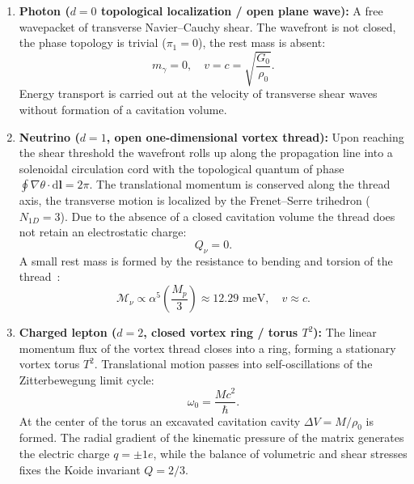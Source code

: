 \documentclass[11pt,a4paper]{article}
\theoremstyle{definition}
\theoremstyle{remark}
\begin{document}
\begin{enumerate}
\item \textbf{Photon ($d = 0$ topological localization / open plane wave):}
A free wavepacket of transverse Navier--Cauchy shear. The wavefront is not closed, the phase topology is trivial ($\pi_1 = 0$), the rest mass is absent:
\begin{equation}
	m_\gamma = 0, \quad v = c = \sqrt{\frac{G_0}{\rho_0}}.
	\label{eq:photon_mass_zero}
\end{equation}
Energy transport is carried out at the velocity of transverse shear waves without formation of a cavitation volume.
		
\item \textbf{Neutrino ($d = 1$, open one-dimensional vortex thread):}
Upon reaching the shear threshold the wavefront rolls up along the propagation line into a solenoidal circulation cord with the topological quantum of phase $\oint \nabla\theta \cdot \mathrm{d}\mathbf{l} = 2\pi$. The translational momentum is conserved along the thread axis, the transverse motion is localized by the Frenet--Serre trihedron ($N_{1D} = 3$). Due to the absence of a closed cavitation volume the thread does not retain an electrostatic charge:
\begin{equation}
	Q_\nu = 0.
	\label{eq:neutrino_charge_zero}
\end{equation}
A small rest mass is formed by the resistance to bending and torsion of the thread~\cite{Mindlin1964}:
\begin{equation}
	\mathcal{M}_\nu \propto \alpha^5 \left(\frac{M_p}{3}\right) \approx 12.29\text{ meV}, \quad v \approx c.
	\label{eq:neutrino_mass_scale_concept}
\end{equation}
		
\item \textbf{Charged lepton ($d = 2$, closed vortex ring / torus $T^2$):}
The linear momentum flux of the vortex thread closes into a ring, forming a stationary vortex torus $T^2$. Translational motion passes into self-oscillations of the Zitterbewegung limit cycle:
\begin{equation}
	\omega_0 = \frac{M c^2}{\hbar}.
	\label{eq:zitterbewegung_freq_def}
\end{equation}
At the center of the torus an excavated cavitation cavity $\Delta V = M / \rho_0$ is formed. The radial gradient of the kinematic pressure of the matrix generates the electric charge $q = \pm 1e$, while the balance of volumetric and shear stresses fixes the Koide invariant $Q = 2/3$.
		

\end{enumerate}
\end{document}
